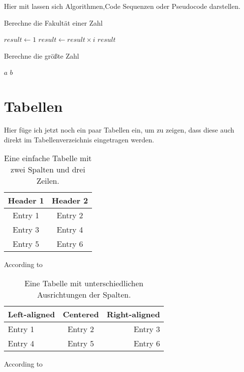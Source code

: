 Hier mit lassen sich Algorithmen,Code Sequenzen oder Pseudocode darstellen.

\begin{algorithm}
    \caption{Berechne die Fakultät einer Zahl}
    \begin{algorithmic}[1]
    \State$result \gets 1$
        \State$result \gets result \times i$
    \EndFor
    \State\Return$result$
    \EndProcedure
    \end{algorithmic}
\end{algorithm}

\begin{algorithm}
    \caption{Berechne die größte Zahl}
    \begin{algorithmic}[2]
        \State\Return$a$
    \Else
        \State\Return$b$
    \EndIf
    \EndProcedure
    \end{algorithmic}
\end{algorithm}
\nocite{knieps2013}

\newpage
\section{Tabellen}
Hier füge ich jetzt noch ein paar Tabellen ein, um zu zeigen, dass diese auch direkt im Tabellenverzeichnis eingetragen werden.


\begin{table}[h]
    \centering
    \begin{tabular}{|c|c|}
        \hline
        Header 1 & Header 2 \\
        \hline
        Entry 1 & Entry 2 \\
        Entry 3 & Entry 4 \\
        Entry 5 & Entry 6 \\
        \hline
    \end{tabular}
    \caption{Eine einfache Tabelle mit zwei Spalten und drei Zeilen.}
\end{table}
According to \cite{ludger2014}


\begin{table}[h]
    \centering
    \begin{tabular}{|l|c|r|}
        \hline
        \textbf{Left-aligned} & \textbf{Centered} & \textbf{Right-aligned} \\
        \hline
        Entry 1 & Entry 2 & Entry 3 \\
        Entry 4 & Entry 5 & Entry 6 \\
        \hline
    \end{tabular}
    \caption{Eine Tabelle mit unterschiedlichen Ausrichtungen der Spalten.}
\end{table}
According to~\cite{Cormen2001}


\clearpage